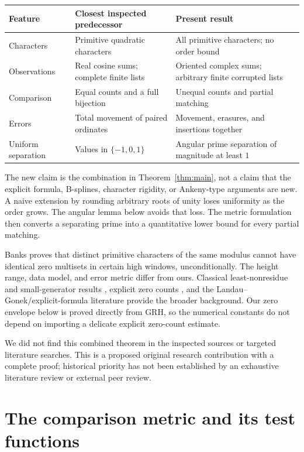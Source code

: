 \documentclass[11pt,letterpaper]{article}
\theoremstyle{definition}\newtheorem{definition}[theorem]{Definition}
\theoremstyle{remark}\newtheorem{remark}[theorem]{Remark}
\begin{document}
\begin{center}
\small
\begin{tabular}{@{}p{.24\linewidth}p{.33\linewidth}p{.35\linewidth}@{}}
\toprule
Feature & Closest inspected predecessor & Present result\\
\midrule
Characters & Primitive quadratic characters & All primitive characters; no order bound\\[2pt]
Observations & Real cosine sums; complete finite lists & Oriented complex sums; arbitrary finite corrupted lists\\[2pt]
Comparison & Equal counts and a full bijection & Unequal counts and partial matching\\[2pt]
Errors & Total movement of paired ordinates & Movement, erasures, and insertions together\\[2pt]
Uniform separation & Values in $\{-1,0,1\}$ & Angular prime separation of magnitude at least $1$\\
\bottomrule
\end{tabular}
\end{center}

The new claim is the combination in Theorem~\ref{thm:main}, not a claim
that the explicit formula, B-splines, character rigidity, or Ankeny-type
arguments are new. A naive extension by rounding arbitrary roots of
unity loses uniformity as the order grows. The angular lemma below
avoids that loss. The metric formulation then converts a separating
prime into a quantitative lower bound for every partial matching.

Banks \cite{banks} proves that distinct primitive characters of the same
modulus cannot have identical zero multisets in certain high windows,
unconditionally. The height range, data model, and error metric differ
from ours. Classical least-nonresidue and small-generator results
\cite{bach,lls}, explicit zero counts \cite{bmor}, and the
Landau--Gonek/explicit-formula literature \cite{fordzaharescu} provide
the broader background. Our zero envelope below is proved directly
from GRH, so the numerical constants do not depend on importing a
delicate explicit zero-count estimate.

We did not find this combined theorem in the inspected sources or
targeted literature searches. This is a proposed original research
contribution with a complete proof; historical priority has not been
established by an exhaustive literature review or external peer review.

\section{The comparison metric and its test functions}
\end{document}
